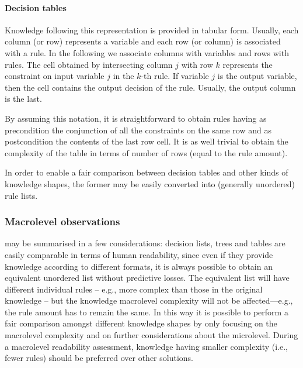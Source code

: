 \documentclass[sigconf]{acmart}
\begin{document}
\paragraph{Decision tables}

Knowledge following this representation is provided in tabular form.
%
Usually, each column (or row) represents a variable and each row (or column) is associated with a rule.
%
In the following we associate columns with variables and rows with rules.
%
The cell obtained by intersecting column $j$ with row $k$ represents the constraint on input variable $j$ in the $k$-th rule.
%
If variable $j$ is the output variable, then the cell contains the output decision of the rule.
%
Usually, the output column is the last.

By assuming this notation, it is straightforward to obtain rules having as precondition the conjunction of all the constraints on the same row and as postcondition the contents of the last row cell.
%
It is as well trivial to obtain the complexity of the table in terms of number of rows (equal to the rule amount).

In order to enable a fair comparison between decision tables and other kinds of knowledge shapes, the former may be easily converted into (generally unordered) rule lists.

\subsubsection{Macrolevel observations}

 may be summarised in a few considerations: decision lists, trees and tables are easily comparable in terms of human readability, since even if they provide knowledge according to different formats, it is always possible to obtain an equivalent unordered list without predictive losses.
%
The equivalent list will have different individual rules -- e.g., more complex than those in the original knowledge -- but the knowledge macrolevel complexity will not be affected---e.g., the rule amount has to remain the same.
%
In this way it is possible to perform a fair comparison amongst different knowledge shapes by only focusing on the macrolevel complexity and on further considerations about the microlevel.
%
During a macrolevel readability assessment, knowledge having smaller complexity (i.e., fewer rules) should be preferred over other solutions.
\end{document}
